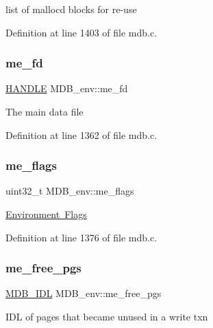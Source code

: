 list of malloc\textquotesingle{}d blocks for re-\/use 

Definition at line 1403 of file mdb.\+c.

\mbox{\label{struct_m_d_b__env_adff94c258f5af201410ef61e51a2f8a0}} 
\subsubsection{\texorpdfstring{me\+\_\+fd}{me\_fd}}
{\footnotesize\ttfamily \mbox{\hyperlink{group__compat_gab521aa5010fb1afb801a899a55569e03}{H\+A\+N\+D\+LE}} M\+D\+B\+\_\+env\+::me\+\_\+fd}

The main data file 

Definition at line 1362 of file mdb.\+c.

\mbox{\label{struct_m_d_b__env_aaa9e268acef9c8f260ec10e967f12b58}} 
\subsubsection{\texorpdfstring{me\+\_\+flags}{me\_flags}}
{\footnotesize\ttfamily uint32\+\_\+t M\+D\+B\+\_\+env\+::me\+\_\+flags}

\mbox{\hyperlink{group__mdb__env}{Environment Flags}} 

Definition at line 1376 of file mdb.\+c.

\mbox{\label{struct_m_d_b__env_a440e7c52dc9d6bc4828c7484f78d2b9b}} 
\subsubsection{\texorpdfstring{me\+\_\+free\+\_\+pgs}{me\_free\_pgs}}
{\footnotesize\ttfamily \mbox{\hyperlink{group__idls_ga238cc39c422225e05cb3897e641ca9e5}{M\+D\+B\+\_\+\+I\+DL}} M\+D\+B\+\_\+env\+::me\+\_\+free\+\_\+pgs}

I\+DL of pages that became unused in a write txn 

